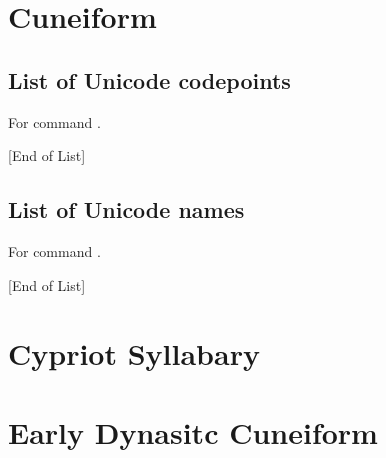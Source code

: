 \documentclass{article}
\newcommand\eolist{{\tiny [End of List]}\par}
\begin{document}
\section{Cuneiform}

\subsection{List of Unicode codepoints}
For command \codedetok{\cutransuc{}}.
\begin{multicols}{4}\noindent
\cutag
\cushowplainlistuc
\eolist
\end{multicols}

\subsection{List of Unicode names}
For command \codedetok{\cutransun{}}.
\begin{multicols}{2}\noindent
\cutag
\cushowplainlistun
\eolist
\end{multicols}

%





\section{Cypriot Syllabary}

\section{Early Dynasitc Cuneiform}
\end{document}
